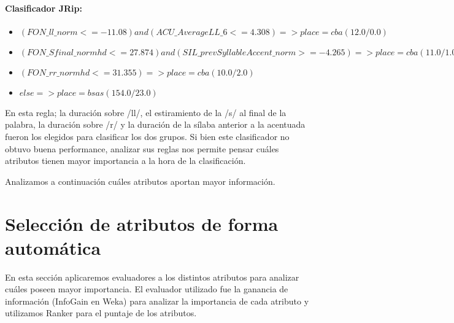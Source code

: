 \paragraph*{Clasificador JRip:}

\begin{flushleft}
\begin{itemize}

\item $(FON\_ll\_norm <= -11.08) and (ACU\_AverageLL\_6 <= 4.308) => place=cba (12.0/0.0)$ \\
\item $(FON\_Sfinal\_normhd <= 27.874) and (SIL\_prevSyllableAccent\_norm >= -4.265) => place=cba (11.0/1.0)$ \\
\item $(FON\_rr\_normhd <= 31.355) => place=cba (10.0/2.0)$ \\
\item $ else  => place=bsas (154.0/23.0)$
\end{itemize}
\end{flushleft}

En esta regla; la duración sobre /ll/, el estiramiento de la /s/ al final de la palabra, la duración sobre /r/ y la duración de la sílaba anterior a la acentuada fueron los elegidos para clasificar los dos grupos. Si bien este clasificador no obtuvo buena performance, analizar sus reglas nos permite pensar cuáles atributos tienen mayor importancia a la hora de la clasificación.

Analizamos a continuación cuáles atributos aportan mayor información.

\section{Selección de atributos de forma automática}



En esta sección aplicaremos evaluadores a los distintos atributos para analizar cuáles poseen mayor importancia. El evaluador utilizado fue la ganancia de información (InfoGain en Weka) para analizar la importancia de cada atributo y utilizamos Ranker para el puntaje de los atributos. 

